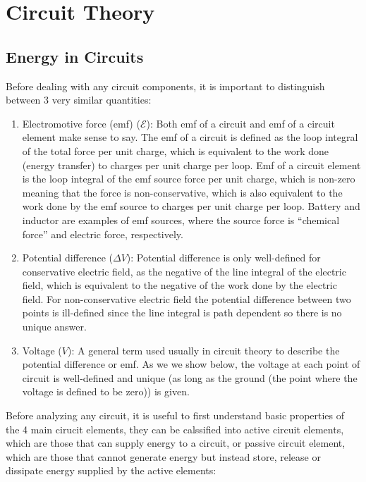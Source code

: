 \documentclass[english,a4paper,12pt]{report}
\begin{document}
\chapter{Circuit Theory}

\section{Energy in Circuits}

Before dealing with any circuit components, it is important to distinguish between 3 very similar quantities:

\begin{enumerate}
    \item Electromotive force (emf) (\(\mathcal{E}\)): Both emf of a circuit and emf of a circuit element make sense to say. The emf of a circuit is defined as the loop integral of the total force per unit charge, which is equivalent to the work done (energy transfer) to charges per unit charge per loop. Emf of a circuit element is the loop integral of the emf source force per unit charge, which is non-zero meaning that the force is non-conservative, which is also equivalent to the work done by the emf source to charges per unit charge per loop. Battery and inductor are examples of emf sources, where the source force is ``chemical force'' and electric force, respectively.
    \item Potential difference (\(\Delta V\)): Potential difference is only well-defined for conservative electric field, as the negative of the line integral of the electric field, which is equivalent to the negative of the work done by the electric field. For non-conservative electric field the potential difference between two points is ill-defined since the line integral is path dependent so there is no unique answer. 
    \item Voltage (\(V\)): A general term used usually in circuit theory to describe the potential difference or emf. As we we show below, the voltage at each point of circuit is well-defined and unique (as long as the ground (the point where the voltage is defined to be zero)) is given.
\end{enumerate}


Before analyzing any circuit, it is useful to first understand basic properties of the 4 main cirucit elements, they can be calssified into active circuit elements, which are those that can supply energy to a circuit, or passive circuit element, which are those that cannot generate energy but instead store, release or dissipate energy supplied by the active elements:
\end{document}
